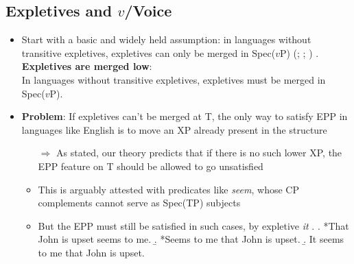 \documentclass[letterpaper,10pt]{handout_nick}
\begin{document}
\subsection{Expletives and $v$/Voice}
\begin{itemize}
\item Start with a basic and widely held assumption: in languages without transitive expletives, expletives can only be merged in Spec($v$P) (\citealt{richards05}; \citealt{deal09}; \citealt{wu17})
\ex.\label{low-merge} \textbf{Expletives are merged low}:\\
In languages without transitive expletives, expletives must be merged in Spec($v$P).

\item \textbf{Problem}: If expletives can't be merged at T, the only way to satisfy EPP in languages like English is to move an XP already present in the structure
\begin{itemize}
\item[$\Rightarrow$] As stated, our theory predicts that if there is no such lower XP, the EPP feature on T should be allowed to go unsatisfied
\item This is arguably attested with predicates like \emph{seem}, whose CP complements cannot serve as Spec(TP) subjects
\item But the EPP must still be satisfied in such cases, by expletive \emph{it}
\ex. \a. *That John is upset seems to me.
\b. *Seems to me that John is upset.
\b. It seems to me that John is upset.


\end{itemize}
\end{itemize}
\end{document}
